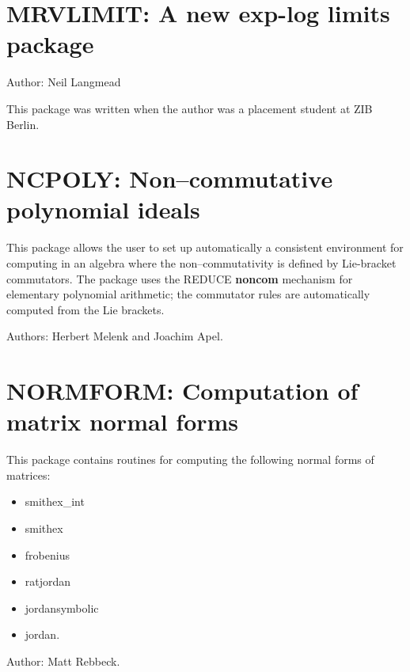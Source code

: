 \newpage

\section{MRVLIMIT: A new exp-log limits package}

Author: Neil Langmead

This package was written when the author was a placement student at ZIB Berlin.


\section{NCPOLY: Non--commutative polynomial ideals}

This package allows the user to set up automatically a consistent
environment for computing in an algebra where the non--commutativity is
defined by Lie-bracket commutators.  The package uses the {REDUCE} {\bf
noncom} mechanism for elementary polynomial arithmetic; the commutator
rules are automatically computed from the Lie brackets.

Authors: Herbert Melenk and Joachim Apel.


\newpage

\section{NORMFORM: Computation of matrix normal forms} 
\label{NORMFORM}

This package contains routines for computing the following
normal forms of matrices:
\begin{itemize}
\item smithex\_int
\item smithex
\item frobenius
\item ratjordan
\item jordansymbolic
\item jordan.
\end{itemize}

Author: Matt Rebbeck.


\newpage

